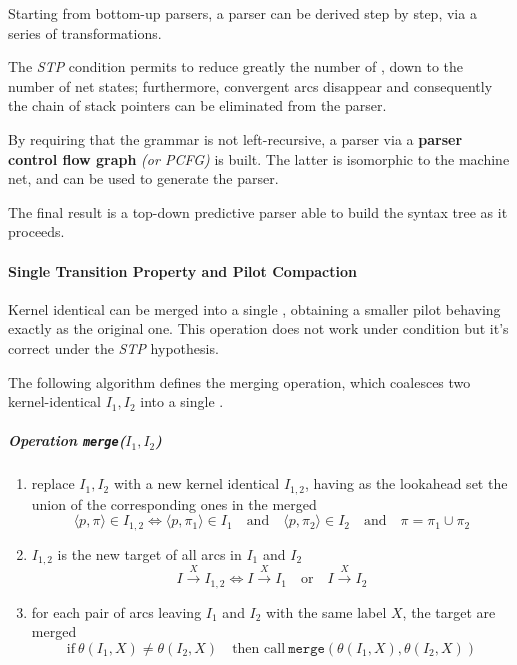 \documentclass[english]{article}
\begin{document}
Starting from bottom-up parsers, a \ello parser can be derived step by step, via a series of transformations.

The \textit{STP} condition permits to reduce greatly the number of \mstates, down to the number of net states;
furthermore, convergent arcs disappear and consequently the chain of stack pointers can be eliminated from the parser.

By requiring that the grammar is not left-recursive, a parser via a \textbf{parser control flow graph} \textit{(or PCFG)} is built.
The latter is isomorphic to the machine net, and can be used to generate the parser.

The final result is a top-down predictive parser able to build the syntax tree as it proceeds.

\paragraph{Single Transition Property and Pilot Compaction}

Kernel identical \mstates can be merged into a single \mstate, obtaining a smaller pilot behaving exactly as the original one.
This operation does not work under \elro condition but it's correct under the \textit{STP} hypothesis.

The following algorithm defines the merging operation, which coalesces two kernel-identical \mstates \(I_1, I_2\) into a single \mstate.

\subparagraph*{Operation \texttt{merge}(\(I_1, I_2\))}

\begin{enumerate}
  \item replace \mstates \(I_1, I_2\) with a new kernel identical \mstate \(I_{1,2}\), having as the lookahead set the union of the corresponding ones in the merged \mstates
        \[ \langle p, \pi \rangle \in I_{1, 2} \iff \langle p, \pi_1 \rangle \in I_1 \quad \text{and} \quad \langle p, \pi_2 \rangle \in I_2 \quad \text{and} \quad \pi = \pi_1 \cup \pi_2 \]
  \item \mstate \(I_{1,2}\) is the new target of all arcs in \(I_1\) and \(I_2\)
        \[ I \xrightarrow{X} I_{1,2} \iff I \xrightarrow{X} I_1 \quad \text{or} \quad I \xrightarrow{X} I_2 \]
  \item for each pair of arcs leaving \(I_1\) and \(I_2\) with the same label \(X\), the target \mstates are merged
        \[ \text{if} \ \theta(I_1, X) \neq \theta(I_2, X) \quad \text{then call} \ \texttt{merge}(\theta(I_1, X), \theta(I_2, X)) \]
\end{enumerate}
\end{document}
